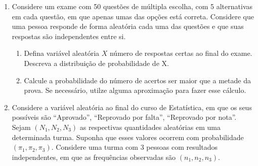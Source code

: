 \documentclass[]{book}
\providecommand{\tightlist}{%
  \setlength{\itemsep}{0pt}\setlength{\parskip}{0pt}}
\begin{document}
\begin{enumerate}
\def\labelenumi{\arabic{enumi}.}
\item
  Considere um exame com 50 questões de múltipla escolha, com 5 alternativas em cada questão, em que apenas umas das opções está correta. Considere que uma pessoa responde de forma aleatória cada uma das questões e que suas respostas são independentes entre si.

  \begin{enumerate}
  \def\labelenumii{\alph{enumii}.}
  \tightlist
  \item
    Defina variável aleatória \(X\) número de respostas certas ao final do exame. Descreva a distribuição de probabilidade de X.
  \item
    Calcule a probabilidade do número de acertos ser maior que a metade da prova. Se necessário, utilze alguma aproximação para fazer esse cálculo.
  \end{enumerate}
\item
  Considere a variável aleatória ao final do curso de Estatística, em que os seus possíveis são ``Aprovado'', ``Reprovado por falta'', ``Reprovado por nota''. Sejam \((N_1, N_2, N_3)\) as respectivas quantidades aleatórias em uma determinada turma. Suponha que esses valores ocorrem com probabilidade \((\pi_1, \pi_2, \pi_3)\). Considere uma turma com 3 pessoas com resultados independentes, em que as frequências observadas são \((n_1, n_2, n_3)\).


\end{enumerate}
\end{document}
